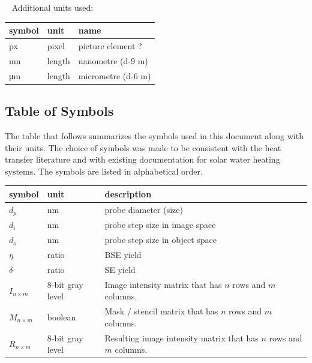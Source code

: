 \documentclass[12pt]{article}
\begin{document}
~\newline
Additional units used:
~\newline

  \noindent \begin{tabular}{l l l} 
    \toprule		
    \textbf{symbol} & \textbf{unit} & \textbf{name}\\
    \midrule
    px & pixel & picture element ?\\
    \si{\nm} & length & nanometre (\num{d-9} m)\\
    \si{\um} & length & micrometre (\num{d-6} m)\\
    \bottomrule
  \end{tabular}

\subsection{Table of Symbols}

The table that follows summarizes the symbols used in this document along with
their units.  The choice of symbols was made to be consistent with the heat
transfer literature and with existing documentation for solar water heating
systems.  The symbols are listed in alphabetical order.

\renewcommand{\arraystretch}{1.2}
\noindent \begin{longtable*}{l l p{12cm}} \toprule
\textbf{symbol} & \textbf{unit} & \textbf{description}\\
\midrule 
$d_p$ & \si[per-mode=symbol] {\nm} & probe diameter (size)\\
$d_i$ & \si[per-mode=symbol] {\nm} & probe step size in image space\\
$d_o$ & \si[per-mode=symbol] {\nm} & probe step size in object space\\
$\eta$ & ratio & BSE yield \\
$\delta$ & ratio & SE yield \\
$I_{n\times m}$ & 8-bit gray level & Image intensity matrix that has $n$ rows and $m$ columns.\\
$M_{n\times m}$ & boolean & Mask / stencil matrix that has $n$ rows and $m$ columns.\\
$R_{n\times m}$ & 8-bit gray level & Resulting image intensity matrix that has $n$ rows and $m$ columns.\\
\bottomrule
\end{longtable*}
\end{document}
